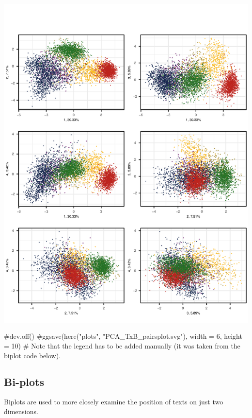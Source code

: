 \documentclass[
  letterpaper,
  DIV=11,
  numbers=noendperiod]{scrreprt}
\newenvironment{Shaded}{\begin{snugshade}}{\end{snugshade}}
\newcommand{\CommentTok}[1]{\textcolor[rgb]{0.37,0.37,0.37}{#1}}
\begin{document}
\includegraphics{G_Ch7_Analysis_files/figure-pdf/PCAtools-pairsplots-TxB-1.pdf}

\begin{Shaded}
\begin{Highlighting}[]
\CommentTok{\#dev.off()}
\CommentTok{\#ggsave(here("plots", "PCA\_TxB\_pairsplot.svg"), width = 6, height = 10)}
\CommentTok{\# Note that the legend has to be added manually (it was taken from the biplot code below).}
\end{Highlighting}
\end{Shaded}

\subsection{Bi-plots}\label{bi-plots-1}

Biplots are used to more closely examine the position of texts on just
two dimensions.
\end{document}
